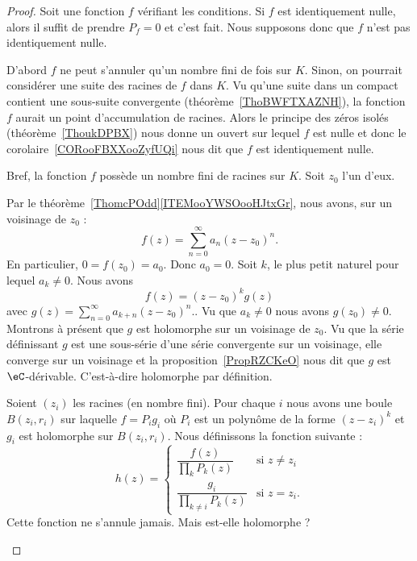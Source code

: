 \begin{proof}
	Soit une fonction \( f\) vérifiant les conditions. Si \( f\) est identiquement nulle, alors il suffit de prendre \( P_f=0\) et c'est fait. Nous supposons donc que \( f\) n'est pas identiquement nulle.

	\begin{subproof}

		D'abord \( f\) ne peut s'annuler qu'un nombre fini de fois sur \( K\). Sinon, on pourrait considérer une suite des racines de \( f\) dans \( K\). Vu qu'une suite dans un compact contient une sous-suite convergente (théorème~\ref{ThoBWFTXAZNH}), la fonction \( f\) aurait un point d'accumulation de racines. Alors le principe des zéros isolés (théorème~\ref{ThoukDPBX}) nous donne un ouvert sur lequel \( f\) est nulle et donc le corolaire~\ref{CORooFBXXooZyfUQi} nous dit que \( f\) est identiquement nulle.


		Bref, la fonction \( f\) possède un nombre fini de racines sur \( K\). Soit \( z_0\) l'un d'eux.

		Par le théorème~\ref{ThomcPOdd}\ref{ITEMooYWSOooHJtxGr}, nous avons, sur un voisinage de \( z_0\) :
		\begin{equation}
			f(z)=\sum_{n=0}^{\infty}a_n(z-z_0)^n.
		\end{equation}
		En particulier, \( 0=f(z_0)=a_0\). Donc \( a_0=0\). Soit \( k\), le plus petit naturel pour lequel \( a_k\neq 0\). Nous avons
		\begin{equation}
			f(z)=(z-z_0)^kg(z)
		\end{equation}
		avec \( g(z)= \sum_{n=0}^{\infty}a_{k+n}(z-z_0)^n.\). Vu que \( a_{k}\neq 0\) nous avons \( g(z_0)\neq 0\). Montrons à présent que \( g\) est holomorphe sur un voisinage de \( z_0\). Vu que la série définissant \( g\) est une sous-série d'une série convergente sur un voisinage, elle converge sur un voisinage et la proposition~\ref{PropRZCKeO} nous dit que \( g\) est \( \eC\)-dérivable. C'est-à-dire holomorphe par définition.


		Soient \( (z_i)\) les racines (en nombre fini). Pour chaque \( i\) nous avons une boule \( B(z_i,r_i)\) sur laquelle \( f=P_ig_i\) où \( P_i\) est un polynôme de la forme \( (z-z_i)^k\) et \( g_i\) est holomorphe sur \( B(z_i,r_i)\). Nous définissons la fonction suivante :
		\begin{equation}
			h(z)=\begin{cases}
				\dfrac{ f(z) }{ \prod_kP_k(z) }        & \text{si } z\neq z_i \\
				\dfrac{ g_i }{ \prod_{k\neq i}P_k(z) } & \text{si } z=z_i.
			\end{cases}
		\end{equation}
		Cette fonction ne s'annule jamais. Mais est-elle holomorphe ?


\end{subproof}
\end{proof}
